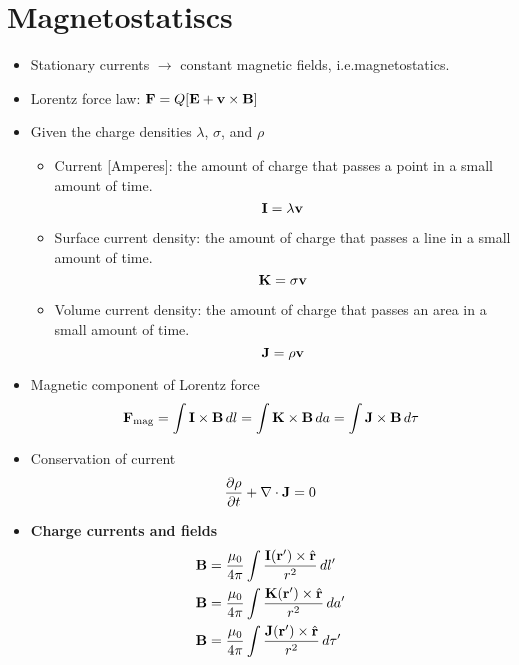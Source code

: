 \documentclass[11pt]{article}
\begin{document}
\section{Magnetostatiscs}
\begin{itemize}

\item Stationary currents $\to$ constant magnetic fields, i.e.\@ magnetostatics.

\item Lorentz force law: $\mathbf{F} = Q [\mathbf{E} + \mathbf{v} \times \mathbf{B} ]$

\item Given the charge densities $\lambda$, $\sigma$, and $\rho$
\begin{itemize}
\item Current [Amperes]: the amount of charge that passes a point in a small amount of time.
\begin{equation}
\mathbf{I} = \lambda \mathbf{v}
\end{equation}

\item Surface current density: the amount of charge that passes a line in a small amount of time.
\begin{equation}
\mathbf{K} = \sigma \mathbf{v}
\end{equation}

\item Volume current density: the amount of charge that passes an area in a small amount of time.
\begin{equation}
\mathbf{J} = \rho \mathbf{v}
\end{equation}
\end{itemize}

\item Magnetic component of Lorentz force
\begin{equation}
\mathbf{F}_{\text{mag}} = \int \mathbf{I} \times \mathbf{B} \, dl = \int \mathbf{K} \times \mathbf{B} \, da = \int \mathbf{J} \times \mathbf{B} \, d\tau
\end{equation}

\item Conservation of current
\begin{equation}
\frac{\partial \rho}{\partial t} + \nabla \cdot \mathbf{J} = 0
\end{equation}

\item \textbf{Charge currents and fields}
\begin{align}
\mathbf{B} &= \frac{\mu_0}{4\pi} \int \frac{\mathbf{I}(\mathbf{r}') \times \hat{\mathbf{r}}}{r^2}\, dl' \\
\mathbf{B} &= \frac{\mu_0}{4\pi} \int \frac{\mathbf{K}(\mathbf{r}') \times \hat{\mathbf{r}}}{r^2}\, da' \\
\mathbf{B} &= \frac{\mu_0}{4\pi} \int \frac{\mathbf{J}(\mathbf{r}') \times \hat{\mathbf{r}}}{r^2}\, d\tau' \label{eq:bfield_from_den}
\end{align}


\end{itemize}
\end{document}
